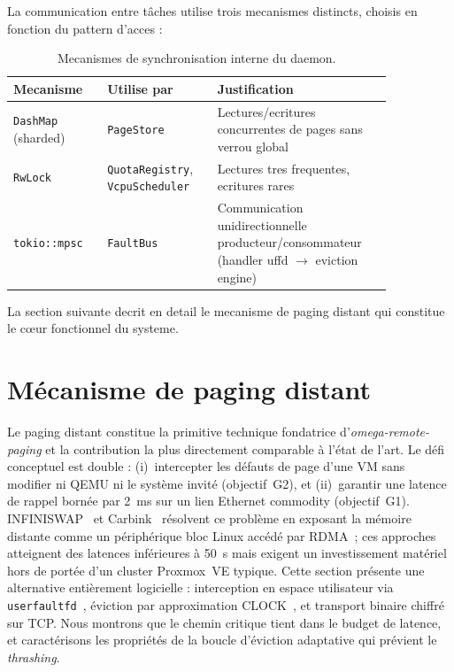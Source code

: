 La communication entre tâches utilise trois mecanismes distincts, choisis en fonction du pattern d'acces :

\begin{table}[htbp]
    \centering
    \caption{Mecanismes de synchronisation interne du daemon.}
    \label{tab:sync-mecanismes}
    \begin{tabular}{p{0.22\linewidth} p{0.25\linewidth} p{0.38\linewidth}}
        \toprule
        \textbf{Mecanisme} & \textbf{Utilise par} & \textbf{Justification} \\
        \midrule
        \texttt{DashMap} (sharded) & \texttt{PageStore} & Lectures/ecritures concurrentes de pages sans verrou global \\
        \texttt{RwLock} & \texttt{QuotaRegistry}, \texttt{VcpuScheduler} & Lectures tres frequentes, ecritures rares \\
        \texttt{tokio::mpsc} & \texttt{FaultBus} & Communication unidirectionnelle producteur/consommateur (handler uffd $\to$ eviction engine) \\
        \bottomrule
    \end{tabular}
\end{table}

La section suivante decrit en detail le mecanisme de paging distant qui constitue le cœur fonctionnel du systeme.

\section{Mécanisme de paging distant}
\label{sec:paging-distant}

Le paging distant constitue la primitive technique fondatrice d'\textit{omega-remote-paging} et la contribution la plus directement comparable à l'état de l'art. Le défi conceptuel est double : (i)~intercepter les défauts de page d'une VM sans modifier ni QEMU ni le système invité (objectif~G2), et (ii)~garantir une latence de rappel bornée par 2~ms sur un lien Ethernet commodity (objectif~G1). INFINISWAP~\cite{gu_2017_infiniswap} et Carbink~\cite{zhou_2022_carbink} résolvent ce problème en exposant la mémoire distante comme un périphérique bloc Linux accédé par RDMA~; ces approches atteignent des latences inférieures à 50~\textmu{}s mais exigent un investissement matériel hors de portée d'un cluster Proxmox~VE typique. Cette section présente une alternative entièrement logicielle : interception en espace utilisateur via \texttt{userfaultfd}~\cite{userfaultfd_man}, éviction par approximation CLOCK~\cite{tanenbaum_os,jiang_2005_clockpro}, et transport binaire chiffré sur TCP. Nous montrons que le chemin critique tient dans le budget de latence, et caractérisons les propriétés de la boucle d'éviction adaptative qui prévient le \textit{thrashing}.

